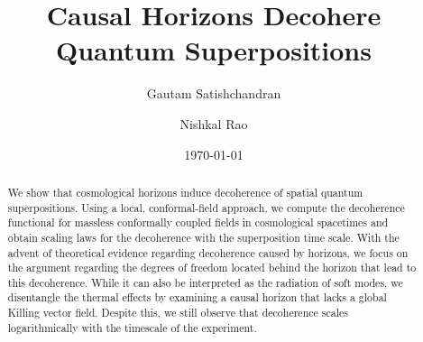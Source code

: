 \documentclass[amsmath,amssymb,nofootinbib,notitlepage,superscriptaddress,twocolumn]{revtex4-2}
\theoremstyle{plain}
\theoremstyle{definition}
\theoremstyle{remark}
\begin{document}
\title{Causal Horizons Decohere Quantum Superpositions}

\author{Gautam Satishchandran }
\author{Nishkal Rao }

\date{\today}

\begin{abstract}
\noindent We show that cosmological horizons induce decoherence of spatial quantum superpositions. Using a local, conformal-field approach, we compute the decoherence functional for massless conformally coupled fields in cosmological spacetimes and obtain scaling laws for the decoherence with the superposition time scale. With the advent of theoretical evidence regarding decoherence caused by horizons, we focus on the argument regarding the degrees of freedom located behind the horizon that lead to this decoherence. While it can also be interpreted as the radiation of soft modes, we disentangle the thermal effects by examining a causal horizon that lacks a global Killing vector field. Despite this, we still observe that decoherence scales logarithmically with the timescale of the experiment.
\end{abstract}
\maketitle


\end{document}
